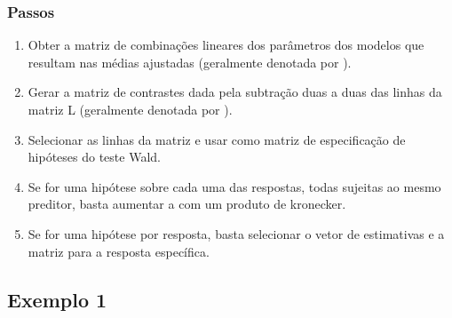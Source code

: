 \documentclass[10pt,
  aspectratio=169,
  serif,
  mathserif,
  professionalfont,
  compress,
  handout,
  ]{beamer}\usepackage[]{graphicx}\usepackage[]{color}
\begin{document}

\begin{frame}

\frametitle{Passos}

\begin{enumerate}
    \itemsep 2ex

  \item Obter a matriz de combinações lineares dos parâmetros dos modelos que resultam nas médias ajustadas (geralmente denotada por ).

  \item Gerar a matriz de contrastes dada pela subtração duas a duas das linhas da matriz L (geralmente denotada por ).

  \item Selecionar as linhas da matriz  e usar como matriz de especificação de hipóteses do teste Wald.

  \item Se for uma hipótese sobre cada uma das respostas, todas sujeitas ao mesmo preditor, basta aumentar a  com um produto de kronecker.

  \item Se for uma hipótese por resposta, basta selecionar o vetor de estimativas e a matriz  para a resposta específica.
  
\end{enumerate}

\end{frame}

\subsection{Exemplo 1}
\end{document}
